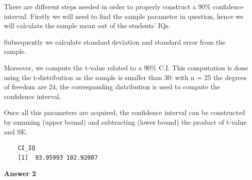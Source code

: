 \documentclass[12pt,letterpaper]{article}
\begin{document}
\noindent There are different steps needed in order to properly construct a 90\% confidence interval. Firstly we will need to find the sample parameter in question, hence we will calculate the sample mean out of the students' IQs.\\
\vspace{.5cm}
  
\vspace{.5cm}
\noindent Subsequently we calculate standard deviation and standard error from the sample. \\
\vspace{.5cm}
 
\vspace{.5cm}
\noindent Moreover, we compute the t-value related to a 90\% C.I. This computation is done using the t-distribution as the sample is smaller than 30: with n = 25 the degrees of freedom are 24, the corresponding distribution is used to compute the confidence interval. \\
\vspace{.5cm}
  
\vspace{.5cm}
\noindent Once all this parameters are acquired, the confidence interval can be constructed by summing (upper bound) and subtracting (lower bound) the product of t-value and SE. \\
\vspace{.5cm}
  
\begin{verbatim}
	CI_IQ
	[1]  93.95993 102.92007
\end{verbatim}
\vspace{.5cm}
\noindent\textbf{Answer 2}\\
\end{document}
